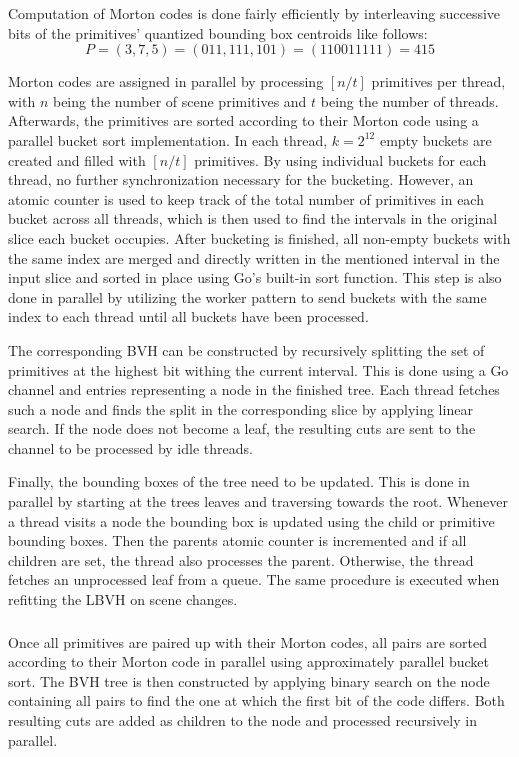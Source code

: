 Computation of Morton codes is done fairly efficiently by interleaving successive bits of the primitives' quantized bounding box 
centroids like follows: 
\[P=(3,7,5)=(011,111,101)=(110011111)=415\] %

Morton codes are assigned in parallel by processing $[n/t]$ primitives per thread, with $n$ being the number of scene primitives and $t$ being the number of threads. Afterwards, the primitives are sorted according to their Morton code using a parallel bucket sort implementation. In each thread, $k=2^{12}$ empty buckets are created and filled with $[n/t]$ primitives. By using individual buckets for each thread, no further synchronization necessary for the bucketing. However, an atomic counter is used to keep track of the total number of primitives in each bucket across all threads, which is then used to find the intervals in the original slice each bucket occupies. After bucketing is finished, all non-empty buckets with the same index are merged and directly written in the mentioned interval in the input slice and sorted in place using Go's built-in sort function. This step is also done in parallel by utilizing the worker pattern to send buckets with the same index to each thread until all buckets have been processed.

The corresponding BVH can be constructed by recursively splitting the set of primitives at the highest bit withing the current interval. This is done using a Go channel and entries representing a node in the finished tree. Each thread fetches such a node and finds the split in the corresponding slice by applying linear search. If the node does not become a leaf, the resulting cuts are sent to the channel to be processed by idle threads.

Finally, the bounding boxes of the tree need to be updated. This is done in parallel by starting at the trees leaves and traversing towards the root. Whenever a thread visits a node the bounding box is updated using the child or primitive bounding boxes. Then the parents atomic counter is incremented and if all children are set, the thread also processes the parent. Otherwise, the thread fetches an unprocessed leaf from a queue. The same procedure is executed when refitting the LBVH on scene changes. 
\subsubsection{}
Once all primitives are paired up with their Morton codes, all pairs are sorted according to their Morton code in parallel using approximately parallel bucket sort. The BVH tree is then constructed by applying binary search on the node containing all pairs to find the one at which the first bit of the code differs. Both resulting cuts are added as children to the node and processed recursively in parallel.




